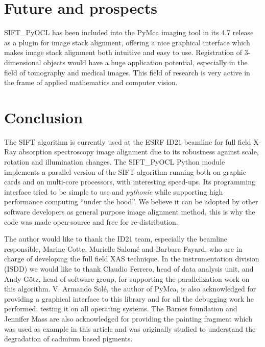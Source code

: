 \documentclass[preprint]{iucr}
\begin{document}
\section{Future and prospects}

SIFT\_PyOCL has been included into the PyMca imaging tool \cite{pymca} in its
4.7 release as a plugin for image stack alignment, offering a nice graphical
interface which makes image stack alignment both intuitive and easy to use.
Registration of 3-dimensional objects would have a huge application potential,
especially in the field of tomography and medical images.
This field of research is very active in the frame of applied mathematics and
computer vision.


\section{Conclusion}

The SIFT algorithm is currently used at the ESRF ID21 beamline for full field
X-Ray absorption spectroscopy image alignment due to its robustness against
scale, rotation and illumination changes.
The SIFT\_PyOCL Python module implements a parallel version of the SIFT
algorithm running both on graphic cards and on multi-core processors, with
interesting speed-ups.
Its programming interface tried to be simple to use and \emph{pythonic} while
supporting high performance computing ``under the hood''.
We believe it can be adopted by other software developers as general purpose
image alignment method, this is why the code was made open-source and free for
re-distribution.



The author would like to thank the ID21 team, especially the beamline
responsible, Marine Cotte, Murielle Salomé and Barbara Fayard, who are in charge
of developing the full field XAS technique.
In the instrumentation division (ISDD) we would like to thank Claudio Ferrero,
head of data analysis unit, and Andy G\"otz, head of software group, for
supporting the parallelization work on this algorithm.
V. Armando Solé, the
author of PyMca, is also acknowledged for providing a graphical interface to
this library and for all the debugging work he performed, testing it on all
operating systems.
The Barnes foundation and Jennifer Mass are also acknowledged for providing
the painting fragment which was used as example in this article and was originally studied to
understand the degradation of cadmium based pigments.


\end{document}
